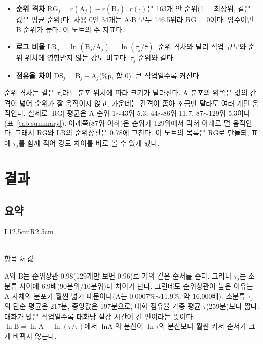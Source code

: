 \documentclass[11pt]{article}
\begin{document}
\begin{itemize}[leftmargin=*]
  \item \textbf{순위 격차} $\mathrm{RG}_j = r(\text{A}_j) - r(\text{B}_j)$. $r(\cdot)$은 163개 안 순위(1 = 최상위, 같은 값은 평균 순위)다. 사용 0인 34개는 A$\cdot$B 모두 146.5위라 RG = 0이다. 양수이면 B 순위가 높다. 이 노트의 주 지표다.
  \item \textbf{로그 비율} $\mathrm{LR}_j = \ln(\text{B}_j / \text{A}_j) = \ln(\tau_j / \bar\tau)$. 순위 격차와 달리 직업 규모와 순위 위치에 영향받지 않는 강도 비교다. $\tau_j$ 순위와 같다.
  \item \textbf{점유율 차이} $\mathrm{DS}_j = \text{B}_j - \text{A}_j$(\%p, 합 0). 큰 직업일수록 커진다.
\end{itemize}
순위 격차는 같은 $\tau_j$라도 분포 위치에 따라 크기가 달라진다. A 분포의 위쪽은 값의 간격이 넓어 순위가 잘 움직이지 않고, 가운데는 간격이 좁아 조금만 달라도 여러 계단 움직인다. 실제로 $|\mathrm{RG}|$ 평균은 A 순위 1$\sim$43위 5.3, 44$\sim$86위 11.7, 87$\sim$129위 5.3이다(표~\ref{tab:summary}). 아래쪽(87위 이하)은 순위가 129위에서 막혀 아래로 덜 움직인다. 그래서 RG와 LR의 순위상관은 0.78에 그친다. 이 노트의 목록은 RG로 만들되, 표에 $\tau_j$를 함께 적어 강도 차이를 바로 볼 수 있게 했다.

\section{결과}

\subsection{요약}

\begin{longtable}{L{12.5cm}R{2.5cm}}
\caption{A와 B의 관계, 대화당 절감 시간, 순위 격차 요약(소분류 163개, 사용 0인 34개 포함; τ와 LR은 사용 > 0인 129개)}\label{tab:summary}\\
\toprule
항목 & 값 \\
\midrule
\endfirsthead

\bottomrule
\end{longtable}

A와 B는 순위상관 0.98(129개만 보면 0.96)로 거의 같은 순서를 준다. 그러나 $\tau_j$는 소분류 사이에 6.9배(90분위/10분위)나 차이가 난다. 그런데도 순위상관이 높은 이유는 A 자체의 분포가 훨씬 넓기 때문이다(A는 0.0007\%$\sim$11.9\%, 약 16,000배). 소분류 $\tau_j$의 단순 평균은 217분, 중앙값은 197분으로, 대화 점유율 가중 평균 $\bar\tau$(259분)보다 짧다. 대화가 많은 직업일수록 대화당 절감 시간이 긴 편이라는 뜻이다. $\ln \text{B} = \ln \text{A} + \ln(\tau/\bar\tau)$에서 $\ln \text{A}$의 분산이 $\ln \tau$의 분산보다 훨씬 커서 순서가 크게 바뀌지 않는다.
\end{document}
